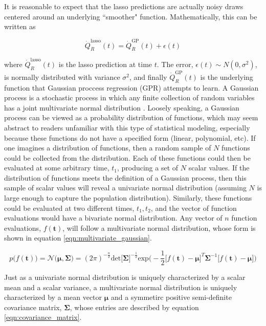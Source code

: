 \documentclass{article}
\begin{document}
It is reasonable to expect that the lasso predictions are actually noisy draws centered around an underlying ``smoother" function. Mathematically, this can be written as

 \begin{equation}
  \label{eqn:gaussian_process_model}
  \dot{Q}_{R}^{\text{lasso}}(t) = \dot{Q}_{R}^{\text{GP}}(t) + \epsilon(t)
\end{equation}

where $\dot{Q}_{R}^{\text{lasso}}(t)$ is the lasso prediction at time $t$. The error, $\epsilon(t) \sim N(0,\sigma^2)$, is normally distributed with variance $\sigma^2$, and finally $\dot{Q}_{R}^{\text{GP}}(t)$ is the underlying function that Gaussian proccess regression (GPR) attempts to learn. A Gaussian process is a stochastic process in which any finite collection of random variables has a joint multivariate normal distribution \cite{lee2017deep}. Loosely speaking, a Gaussian process can be viewed as a probability distribution of functions, which may seem abstract to readers unfamiliar with this type of statistical modeling, especially because these functions do not have a specified form (linear, polynomial, etc). If one imagines a distribution of functions, then a random sample of $N$ functions could be collected from the distribution. Each of these functions could then be evaluated at some arbitrary time, $t_1$, producing a set of $N$ scalar values. If the distribution of functions meets the definition of a Gaussian process, then this sample of scalar values will reveal a univariate normal distribution (assuming $N$ is large enough to capture the population distribution). Similarly, these functions could be evaluated at two different times, $t_1, t_2$, and the vector of function evaluations would have a bivariate normal distribution. Any vector of $n$ function evaluations, $f(\boldsymbol{t})$, will follow a multivariate normal distribution, whose form is shown in equation \ref{eqn:multivariate_gaussian}.

 \begin{equation}
  \label{eqn:multivariate_gaussian}
  p\bigg(f(\boldsymbol{t}) \bigg) = \mathcal{N}\Big(\boldsymbol{\mu}, \boldsymbol{\Sigma} \Big) = 
  (2\pi)^{-\frac{n}{2}}\text{det}\big[\boldsymbol{\Sigma}\big]^{-\frac{1}{2}}\text{exp}\bigg(-\frac{1}{2}\big[f(\boldsymbol{t}) - \boldsymbol{\mu}\big]^T \boldsymbol{\Sigma}^{-1}\big[f(\boldsymbol{t}) - \boldsymbol{\mu}\big] \bigg)
\end{equation}

Just as a univariate normal distribution is uniquely characterized by a scalar mean and a scalar variance, a multivariate normal distribution is uniquely characterized by a mean vector $\boldsymbol{\mu}$ and a symmetirc positive semi-definite covariance matrix, $\boldsymbol{\Sigma}$, whose entries are described by equation \ref{eqn:covariance_matrix}.
\end{document}
